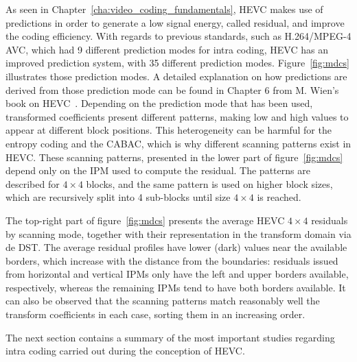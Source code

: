 \documentclass[11pt,a4paper,openright,twoside]{book}
\numberwithin{equation}{section} %
\numberwithin{figure}{section} %
\numberwithin{table}{section} %
\begin{document}
As seen in Chapter~\ref{cha:video_coding_fundamentals}, \ac{HEVC} makes
use of predictions in order to generate a low signal energy, called
residual, and improve the coding efficiency.
With regards to previous standards, such as H.264/\ac{MPEG}-4 \ac{AVC},
which had 9 different prediction modes for intra coding, \ac{HEVC} has
an improved prediction system, with 35 different prediction modes.
Figure~\ref{fig:mdcs} illustrates those prediction modes.
A detailed explanation on how predictions are derived from those
prediction mode can be found in Chapter 6 from M.
Wien's book on \ac{HEVC}~\cite{wien-15-hevc}.
Depending on the prediction mode that has been used, transformed
coefficients present different patterns, making low and high values to
appear at different block positions.
This heterogeneity can be harmful for the entropy coding and the
\ac{CABAC}, which is why different scanning patterns exist in \ac{HEVC}.
These scanning patterns, presented in the lower part of
figure~\ref{fig:mdcs} depend only on the \ac{IPM} used to compute the
residual.
The patterns are described for $4\times4$ blocks, and the same pattern is used
on higher block sizes, which are recursively split into 4 sub-blocks until
size $4\times4$ is reached.

The top-right part of figure~\ref{fig:mdcs} presents the average
\ac{HEVC} $4\times4$ residuals by scanning mode, together with their
representation in the transform domain via de \ac{DST}.
The average residual profiles have lower (dark) values near the
available borders, which increase with the distance from the
boundaries: residuals issued from horizontal and vertical \acp{IPM} only
have the left and upper borders available, respectively, whereas the
remaining \acp{IPM} tend to have both borders available.
It can also be observed that the scanning patterns match reasonably well
the transform coefficients in each case, sorting them in an increasing
order.

The next section contains a summary of the most important studies
regarding intra coding carried out during the conception of \ac{HEVC}.
\end{document}
